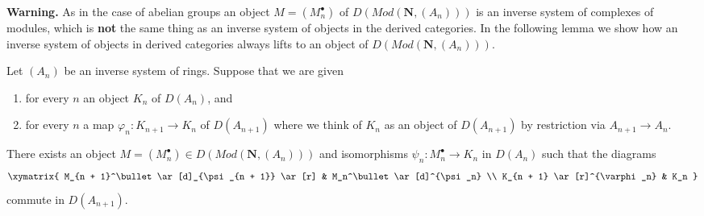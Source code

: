 \noindent
{\bf Warning.} As in the case of abelian groups an object
$M = (M_n^\bullet)$ of
$D(\textit{Mod}(\mathbf{N}, (A_n)))$ is an inverse system of complexes
of modules, which is {\bf not} the same thing as an inverse system of
objects in the derived categories. In the following lemma we show
how an inverse system of objects in derived categories always lifts
to an object of $D(\textit{Mod}(\mathbf{N}, (A_n)))$.

\begin{lemma}
\label{lemma-lift-to-system-complexes}
Let $(A_n)$ be an inverse system of rings. Suppose that we are given
\begin{enumerate}
\item for every $n$ an object $K_n$ of $D(A_n)$, and
\item for every $n$ a map $\varphi_n : K_{n + 1} \to K_n$ of
$D(A_{n + 1})$ where we think of $K_n$ as an object of $D(A_{n + 1})$
by restriction via $A_{n + 1} \to A_n$.
\end{enumerate}
There exists an object
$M = (M_n^\bullet) \in D(\textit{Mod}(\mathbf{N}, (A_n)))$
and isomorphisms $\psi_n : M_n^\bullet \to K_n$ in $D(A_n)$
such that the diagrams
$$
\xymatrix{
M_{n + 1}^\bullet \ar[d]_{\psi_{n + 1}} \ar[r] & M_n^\bullet \ar[d]^{\psi_n} \\
K_{n + 1} \ar[r]^{\varphi_n} & K_n
}
$$
commute in $D(A_{n + 1})$.
\end{lemma}

